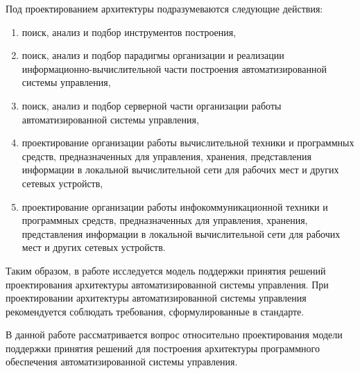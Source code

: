 Под проектированием архитектуры подразумеваются следующие действия:
\begin{enumerate}
    \item  поиск, анализ и подбор инструментов построения,
    \item  поиск, анализ и подбор парадигмы организации и реализации информационно-вычислительной части построения автоматизированной системы управления,
    \item  поиск, анализ и подбор серверной части организации работы автоматизированной системы управления,
    \item  проектирование организации работы  вычислительной техники и программных средств, предназначенных для управления, хранения, представления информации в локальной вычислительной сети для рабочих мест и других сетевых устройств,
    \item  проектирование организации работы инфокоммуникационной техники и программных средств, предназначенных для управления, хранения, представления информации в локальной вычислительной сети для рабочих мест и других сетевых устройств.
\end{enumerate}

Таким образом, в работе исследуется модель поддержки принятия решений проектирования архитектуры автоматизированной системы управления. 
При проектировании архитектуры автоматизированной системы управления рекомендуется соблюдать требования, сформулированные в стандарте\cite{ACSSt}.

В данной работе рассматривается вопрос относительно проектирования модели поддержки принятия решений для построения архитектуры программного обеспечения автоматизированной системы управления.

